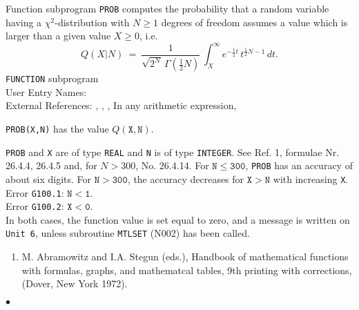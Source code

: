                              
          
\Submitter{}                         
                       
Function subprogram {\tt PROB} computes the probability that a random
variable having a $\chi^2$-distribution with $N \geq 1$
degrees of freedom assumes a value which is larger than a given
value $X \ge 0$, i.e.
$$ Q(X|N) \ = \ \displaystyle
\frac{1}{\sqrt{2^N}\,\Gamma(\textstyle \frac{1}{2}N)}\,
\int_{X}^\infty e^{-\frac{1}{2}t}\,t^{\frac{1}{2}N-1}\,dt. $$
\Structure
{\tt FUNCTION} subprogram \\
User Entry Names: \\
External References: , ,
, 
\Usage
In any arithmetic expression,
\begin{center}
{\tt PROB(X,N)} \quad has the value \quad $Q(\mathtt{X,N})$.
\end{center}
{\tt PROB} and {\tt X} are of type
{\tt REAL} and {\tt N} is of type {\tt INTEGER}.
\Method
See Ref. 1, formulae Nr. 26.4.4, 26.4.5 and, for $N>300$, No. 26.4.14.
\Accuracy
For $\mathtt{N \le 300}$, {\tt PROB} has an accuracy of about six digits.
For $\mathtt{N>300}$, the accuracy decreases for $\mathtt{X>N}$ with
increasing {\tt X}.
\Errorh
Error {\tt G100.1}: $\mathtt{N<1}$. \\
Error {\tt G100.2}: $\mathtt{X<0}$. \\
In both cases,
the function value is set equal to zero, and a message is written on
{\tt Unit 6}, unless subroutine {\tt MTLSET} (N002) has been called.
\Refer
\begin{enumerate}
\item M. Abramowitz and I.A. Stegun (eds.), Handbook of mathematical
functions with formulas, graphs, and mathematcal tables, 9th printing
with corrections, (Dover, New York 1972).
\end{enumerate}
$\bullet$
